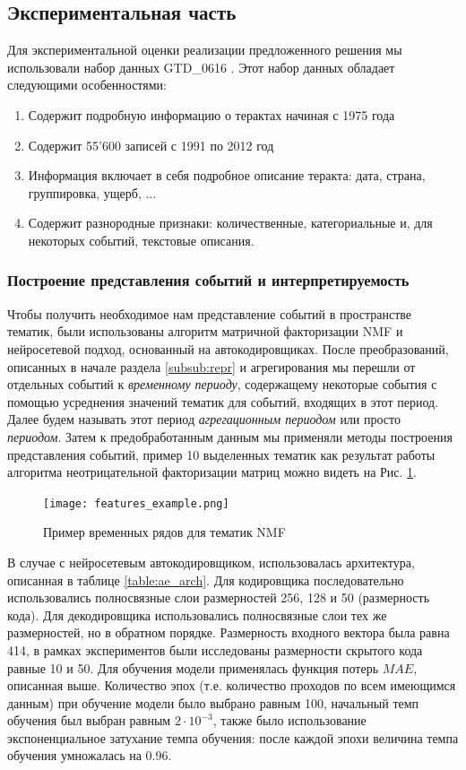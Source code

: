 
\subsection{Экспериментальная часть}
\label{sec:experiments}
Для экспериментальной оценки реализации предложенного решения мы использовали набор данных GTD\_0616 \cite{db:gtd}.
Этот набор данных обладает следующими особенностями:
	\begin{enumerate}
		\item Содержит подробную информацию о терактах начиная с 1975 года
		\item Содержит 55'600 записей с 1991 по 2012 год
        \item Информация включает в себя подробное описание теракта: дата, страна, группировка, ущерб, ...
        \item Содержит разнородные признаки: количественные, категориальные и, для некоторых событий, текстовые описания.
	\end{enumerate}

\subsubsection{Построение представления событий и интерпретируемость}
Чтобы получить необходимое нам представление событий в пространстве тематик, были использованы алгоритм матричной факторизации NMF и нейросетевой подход, основанный на автокодировщиках.
После преобразований, описанных в начале раздела \ref{subsub:repr} и агрегирования мы перешли от отдельных событий к \textit{временному периоду}, содержащему некоторые события с помощью усреднения значений тематик для событий, входящих в этот период. Далее будем называть этот период \textit{агрегационным периодом} или просто \textit{периодом}. Затем к предобработанным данным мы применяли методы построения представления событий, пример 10 выделенных тематик как результат работы алгоритма неотрицательной факторизации матриц можно видеть на  Рис. \ref{fig:features_example}.

\begin{figure}
  \texttt{[image: features\_example.png]}
  \caption{Пример временных рядов для тематик NMF}
  \label{fig:features_example}
\end{figure}

В случае с нейросетевым автокодировщиком, использовалась архитектура, описанная в таблице \ref{table:ae_arch}. Для кодировщика последовательно использовались полносвязные слои размерностей 256, 128 и 50 (размерность кода). Для декодировщика использовались полносвязные слои тех же размерностей, но в обратном порядке. Размерность входного вектора была равна 414, в рамках экспериментов были исследованы размерности скрытого кода равные 10 и 50. Для обучения модели применялась функция потерь $MAE$, описанная выше.
Количество эпох (т.е. количество проходов по всем имеющимся данным) при обучение модели было выбрано равным 100, начальный темп обучения был выбран равным  $2\cdot 10^{-3}$, также было использование экспоненциальное затухание темпа обучения: после каждой эпохи величина темпа обучения умножалась на 0.96.

